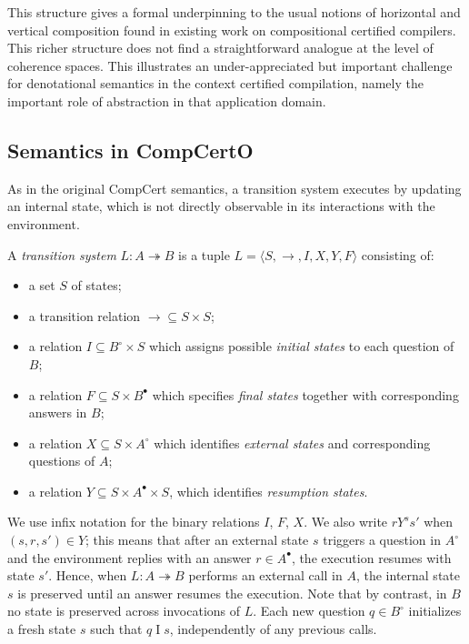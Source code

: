 \documentclass[acmsmall,screen,review,anonymous]{acmart}
\newcommand{\que}{\circ}
\newcommand{\ans}{\bullet}
\begin{document}
This structure gives a formal underpinning to the usual notions of
horizontal and vertical composition
found in existing work on compositional certified compilers.
This richer structure
does not find a straightforward analogue
at the level of coherence spaces.
This illustrates an under-appreciated but important challenge
for denotational semantics in the context certified compilation,
namely the important role of abstraction
in that application domain.


\subsection{Semantics in CompCertO} \label{sec:basic:compcerto} %

As in the original CompCert semantics,
a transition system
executes by updating an internal state,
which is not directly observable
in its interactions with the environment.

\begin{definition} \label{def:lts} %
A \emph{transition system} $L : A \twoheadrightarrow B$
is a tuple $L = \langle S, {\rightarrow}, I, X, Y, F \rangle$
consisting of:
\begin{itemize}
  \item a set $S$ of states;
  \item a transition relation ${\rightarrow} \subseteq S \times S$;
  \item a relation $I \subseteq B^\que \times S$
    which assigns possible \emph{initial states}
    to each question of $B$;
  \item a relation $F \subseteq S \times B^\ans$
    which specifies \emph{final states} together with
    corresponding answers in $B$;
  \item a relation $X \subseteq S \times A^\que$
    which identifies \emph{external states} and
    corresponding questions of $A$;
  \item a relation $Y \subseteq S \times A^\ans \times S$,
    which identifies \emph{resumption states}.
\end{itemize}
\end{definition}

We use infix notation for the binary relations $I$, $F$, $X$.
We also write $r \mathrel{Y^s} s'$ when $(s, r, s') \in Y$;
this means that
after an external state $s$ triggers a question in $A^\que$ %
and the environment replies with an answer $r \in A^\ans$,
the execution resumes with state $s'$.
Hence,
when $L : A \twoheadrightarrow B$
performs an external call in $A$,
the internal state $s$ is preserved
until an answer resumes the execution.
Note that by contrast, in $B$
no state is preserved across invocations of $L$.
Each new question $q \in B^\que$ initializes a fresh state $s$
such that $q \mathrel{I} s$,
independently of any previous calls. %
\end{document}
